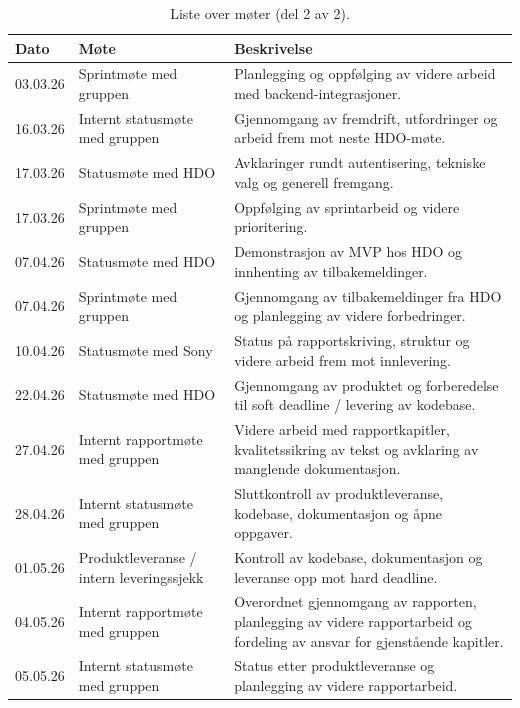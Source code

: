 \begin{table}[htbp]
\centering
\caption{Liste over møter (del 2 av 2).}
\label{tab:moteliste-2}
\small
\begin{tabular}{|p{2.2cm}|p{4.5cm}|p{6.5cm}|}
\hline
\textbf{Dato} & \textbf{Møte} & \textbf{Beskrivelse} \\
\hline
03.03.26 & Sprintmøte med gruppen & Planlegging og oppfølging av videre arbeid med backend-integrasjoner. \\
\hline
16.03.26 & Internt statusmøte med gruppen & Gjennomgang av fremdrift, utfordringer og arbeid frem mot neste HDO-møte. \\
\hline
17.03.26 & Statusmøte med HDO & Avklaringer rundt autentisering, tekniske valg og generell fremgang. \\
\hline
17.03.26 & Sprintmøte med gruppen & Oppfølging av sprintarbeid og videre prioritering. \\
\hline
07.04.26 & Statusmøte med HDO & Demonstrasjon av MVP hos HDO og innhenting av tilbakemeldinger. \\
\hline
07.04.26 & Sprintmøte med gruppen & Gjennomgang av tilbakemeldinger fra HDO og planlegging av videre forbedringer. \\
\hline
10.04.26 & Statusmøte med Sony & Status på rapportskriving, struktur og videre arbeid frem mot innlevering. \\
\hline
22.04.26 & Statusmøte med HDO & Gjennomgang av produktet og forberedelse til soft deadline / levering av kodebase. \\
\hline
27.04.26 & Internt rapportmøte med gruppen & Videre arbeid med rapportkapitler, kvalitetssikring av tekst og avklaring av manglende dokumentasjon. \\
\hline
28.04.26 & Internt statusmøte med gruppen & Sluttkontroll av produktleveranse, kodebase, dokumentasjon og åpne oppgaver. \\
\hline
01.05.26 & Produktleveranse / intern leveringssjekk & Kontroll av kodebase, dokumentasjon og leveranse opp mot hard deadline. \\
\hline
04.05.26 & Internt rapportmøte med gruppen & Overordnet gjennomgang av rapporten, planlegging av videre rapportarbeid og fordeling av ansvar for gjenstående kapitler. \\
\hline
05.05.26 & Internt statusmøte med gruppen & Status etter produktleveranse og planlegging av videre rapportarbeid. \\
\hline
\end{tabular}
\end{table}
